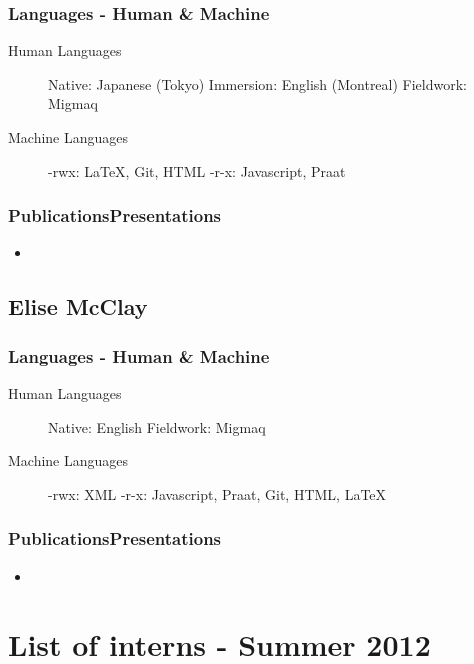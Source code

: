\documentclass[12 pt]{article}
\begin{document}
\subsubsection{Languages - Human \& Machine}
\begin{description}
\item [
Human Languages] Native: Japanese (Tokyo) Immersion:  English (Montreal) Fieldwork: Migmaq 
\item [
Machine Languages] -rwx:  LaTeX, Git, HTML  -r-x:  Javascript, Praat

\end{description}


\subsubsection{PublicationsPresentations}

\begin{itemize}
\item 
\end{itemize}



\subsection{Elise McClay}


\subsubsection{Languages - Human \& Machine}
\begin{description}
\item [
Human Languages] Native:  English  Fieldwork: Migmaq 
\item [
Machine Languages] -rwx: XML -r-x:  Javascript, Praat, Git, HTML, LaTeX

\end{description}


\subsubsection{PublicationsPresentations}

\begin{itemize}
\item 
\end{itemize}



\section {List of interns - Summer 2012}
\end{document}

